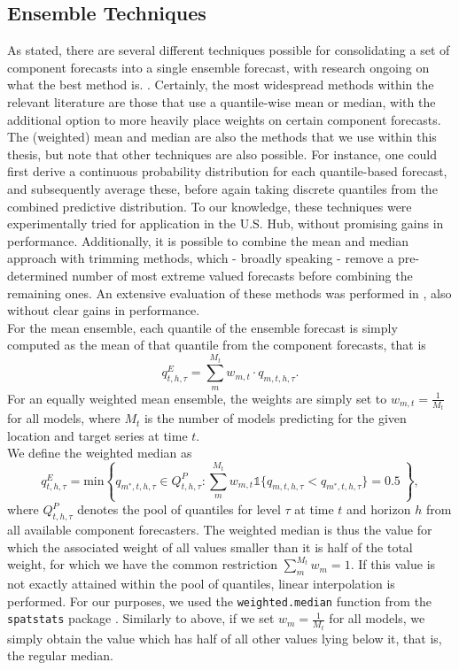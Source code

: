 \subsection{Ensemble Techniques} \label{sub:ensemble_techniques}
As stated, there are several different techniques possible for consolidating a set of component forecasts into a single ensemble forecast, with research ongoing on what the best method is. . Certainly, the most widespread methods within the relevant literature are those that use a quantile-wise mean or median, with the additional option to more heavily place weights on certain component forecasts.\\ 
The (weighted) mean and median are also the methods that we use within this thesis, but note that other techniques are also possible. For instance, one could first derive a continuous probability distribution for each quantile-based forecast, and subsequently average these, before again taking discrete quantiles from the combined predictive distribution. To our knowledge, these techniques were experimentally tried for application in the U.S. Hub, without promising gains in performance. Additionally, it is possible to combine the mean and median approach with trimming methods, which - broadly speaking - remove a pre-determined number of most extreme valued forecasts before combining the remaining ones. An extensive evaluation of these methods was performed in \cite{taylor_combining_2021}, also without clear gains in performance.\\
For the mean ensemble, each quantile of the ensemble forecast is simply computed as the mean of that quantile from the component forecasts, that is
\begin{equation}
q^E_{t,h,\tau} = \sum_m^{M_t} w_{m,t} \cdot q_{m, t, h, \tau}.
\end{equation}
For an equally weighted mean ensemble, the weights are simply set to $w_{m,t} = \frac{1}{M_t}$ for all models, where $M_t$ is the number of models predicting for the given location and target series at time $t$.  \\
We define the weighted median as 
\begin{equation}
q^E_{t,h,\tau} = \text{min}\left\{q_{m^{*},t,h,\tau} \in Q^P_{t,h,\tau}: \sum_m^{M_t}  w_{m,t} \mathbb{1}\{q_{m,t,h,\tau} < q_{m^{*},t,h,\tau} \} = 0.5 \ \right\},
\end{equation}
where $Q^P_{t,h,\tau}$ denotes the pool of quantiles for level $\tau$ at time $t$ and horizon $h$ from all available component forecasters. The weighted median is thus the value for which the associated weight of all values smaller than it is half of the total weight, for which we have the common restriction $\sum_m^{M_t}w_m = 1$. If this value is not exactly attained within the pool of quantiles, linear interpolation is performed. For our purposes, we used the \texttt{weighted.median} function from the \texttt{spatstats} package \citep{baddeley_spatstat_2005}. Similarly to above, if we set $w_m = \frac{1}{M_t}$ for all models, we simply obtain the value which has half of all other values lying below it, that is, the regular median. \\
